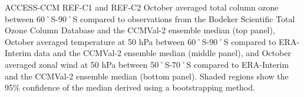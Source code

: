 ACCESS-CCM REF-C1 and REF-C2 October averaged total column ozone between 60˚S-90˚S compared to observations from the Bodeker Scientific Total Ozone Column Database and the CCMVal-2 ensemble median (top panel), October averaged temperature at 50 hPa between 60˚S-90˚S compared to ERA-Interim data and the CCMVal-2 ensemble median (middle panel), and October averaged zonal wind at 50 hPa between 50˚S-70˚S compared to ERA-Interim and the CCMVal-2 ensemble median (bottom panel). Shaded regions show the 95\% confidence of the median derived using a bootstrapping method.
